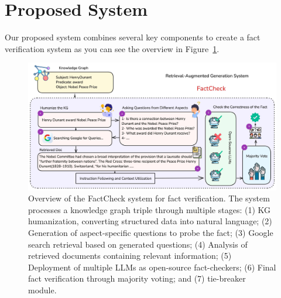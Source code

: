 \section{Proposed System}\label{sec:approach}
Our proposed system combines several key components to create a fact verification system as you can see the overview in Figure~\ref{fig:factcheck-overview}.
\begin{figure}[ht!]
    \centering
    \begin{minipage}[b]{\textwidth}
        \centering
        \includegraphics[width=\textwidth]{res/FactCheckOverview}
        \caption{Overview of the FactCheck system for fact verification. The system processes a knowledge graph triple through multiple stages: (1) \ac{KG} humanization, converting structured data into natural language; (2) Generation of aspect-specific questions to probe the fact; (3) Google search retrieval based on generated questions; (4) Analysis of retrieved documents containing relevant information; (5) Deployment of multiple \ac{LLMs} as open-source fact-checkers; (6) Final fact verification through majority voting; and (7) tie-breaker module.}
        \label{fig:factcheck-overview}
    \end{minipage}
\end{figure}
\newpage

